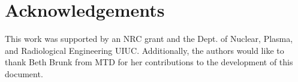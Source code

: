 \documentclass{anstrans}
\begin{document}
\section{Acknowledgements}

This work was supported by an NRC grant and the Dept. of Nuclear, Plasma, and Radiological Engineering UIUC.
Additionally, the authors would like to thank Beth Brunk from MTD for her contributions to the development of this document.



\end{document}
